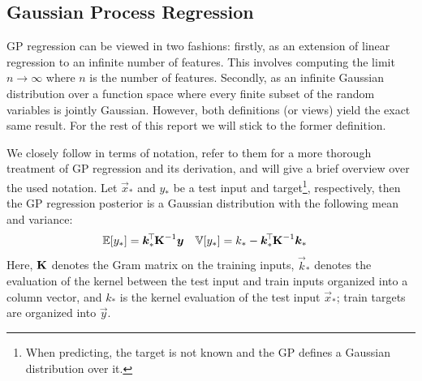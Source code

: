 \subsection{Gaussian Process Regression}

	\ac{GP} regression can be viewed in two fashions:
	firstly, as an extension of linear regression to an infinite number of features.
	This involves computing the limit $n \to \infty$ where $n$ is the number of features.
	Secondly, as an infinite Gaussian distribution over a function space where every finite subset of the random variables is jointly Gaussian.
	However, both definitions (or views) yield the exact same result.
	For the rest of this report we will stick to the former definition.

	We closely follow\cite{rasmussenGaussianProcessesMachine2006} in terms of notation, refer to them for a more thorough treatment of \ac{GP} regression and its derivation, and will give a brief overview over the used notation.
	Let \(\vec{x}_\ast\) and \(y_\ast\) be a test input and target\footnote{When predicting, the target is not known and the \ac{GP} defines a Gaussian distribution over it.}, respectively, then the \ac{GP} regression posterior is a Gaussian distribution with the following mean and variance:
	\begin{equation}
		\begin{aligned}
			\mathbb{E}[y_\ast] &= \bm{k}_\ast^{\!\top\!} \bm{\mathrm{K}}^{-1} \bm{y} &
			\mathbb{V}[y_\ast] &= k_\ast - \bm{k}_\ast^{\!\top\!} \bm{\mathrm{K}}^{-1} \bm{k}_\ast
		\end{aligned}
		\label{eq:gp}
	\end{equation}
	Here, \( \bm{\mathrm{K}} \) denotes the Gram matrix on the training inputs, \(\vec{k}_\ast\) denotes the evaluation of the kernel between the test input and train inputs organized into a column vector, and \(k_\ast\) is the kernel evaluation of the test input \(\vec{x}_\ast\); train targets are organized into \(\vec{y}\).


